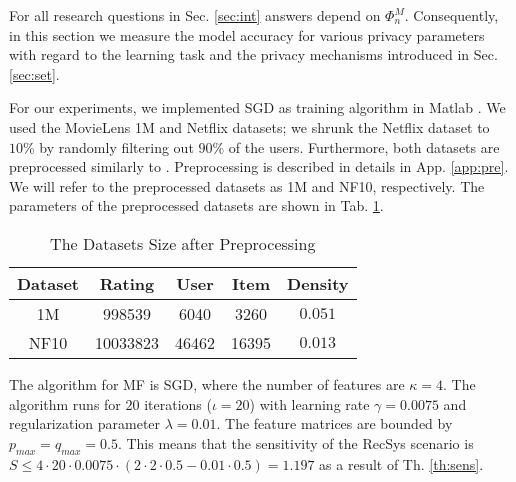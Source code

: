 \documentclass[USenglish,oneside,twocolumn]{article}
\theoremstyle{plain}
\begin{document}
    For all research questions in Sec. \ref{sec:int} answers depend on $\Phi_n^M$. Consequently, in this section we measure the model accuracy for various privacy parameters with regard to the learning task and the privacy mechanisms introduced in Sec. \ref{sec:set}. 
    
    For our experiments, we implemented SGD as training algorithm in Matlab \cite{git}. We used the MovieLens 1M \cite{movielens} and Netflix \cite{netflix} datasets; we shrunk the Netflix dataset to $10\%$ by randomly filtering out $90\%$ of the users. Furthermore, both datasets are preprocessed similarly to \cite{friedman2016differential}. Preprocessing is described in details in App. \ref{app:pre}. We will refer to the preprocessed datasets as 1M and NF10, respectively. The parameters of the preprocessed datasets are shown in Tab. \ref{tab:data}.
    
    \vspace{-0.25cm}
    \begin{table}[h]
        \centering
        \begin{tabular}{|c||c|c|c|c|}
            \hline
            Dataset & Rating & User & Item & Density\\
            \hline
            \hline
            1M & \num{998539} & \num{6040} & \num{3260} & $\num{0.051}$\\
            \hline
            NF10 & \num{10033823} & \num{46462} & \num{16395} & $\num{0.013}$\\
            \hline
        \end{tabular}
        \vspace{0.1cm}
        \caption{The Datasets Size after Preprocessing}
        \label{tab:data}
    \end{table}
    \vspace{-1cm}
    
    The algorithm for MF is SGD, where the number of features are $\kappa=4$. The algorithm runs for $20$ iterations ($\iota=20$) with learning rate $\gamma=\num{0.0075}$ and regularization parameter $\lambda=0.01$. The feature matrices are bounded by $p_{max}=q_{max}=0.5$. This means that the sensitivity of the RecSys scenario is $S\leq4\cdot20\cdot0.0075\cdot(2\cdot2\cdot0.5-0.01\cdot0.5)=1.197$ as a result of Th. \ref{th:sens}. %
    
\end{document}

